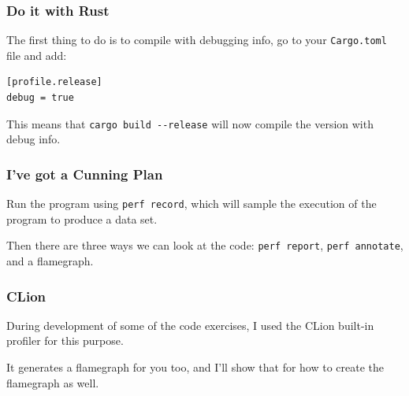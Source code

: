 \begin{frame}[fragile]
\frametitle{Do it with Rust}

The first thing to do is to compile with debugging info, go to your \texttt{Cargo.toml} file and add:
\begin{verbatim}
[profile.release]
debug = true
\end{verbatim}

This means that \verb+cargo build --release+ will now compile the version with debug info.

\end{frame}

\begin{frame}
\frametitle{I've got a Cunning Plan}

Run the program using \texttt{perf record}, which will sample the execution of the program to produce a data set.


Then there are three ways we can look at the code: \texttt{perf report}, \texttt{perf annotate}, and a flamegraph.

\end{frame}


\begin{frame}
\frametitle{CLion}

During development of some of the code exercises, I used the CLion built-in profiler for this purpose. 

It generates a flamegraph for you too, and I'll show that for how to create the flamegraph as well.


\end{frame}





